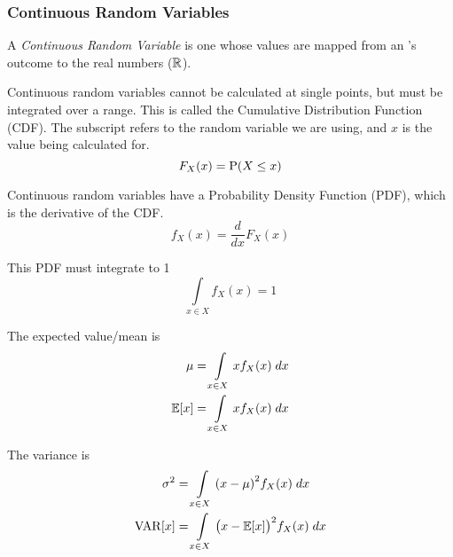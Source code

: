 \subsubsection{Continuous Random Variables}\label{subsubsec:Continuous_Random_Variables}
\begin{definition}\label{def:Continuous_Random_Variable}
  A \emph{Continuous Random Variable} is one whose values are mapped from an 's outcome to the real numbers ($\operatorname{\mathbb{R}}$).

  Continuous random variables cannot be calculated at single points, but must be integrated over a range.
  This is called the Cumulative Distribution Function (CDF).
  The subscript refers to the random variable we are using, and $x$ is the value being calculated for.
  \begin{equation}\label{eq:Continuous_Random_Variable-CDF}
    F_{X}(x) = \operatorname{\operatorname{P}}(X \leq x)
  \end{equation}

  Continuous random variables have a Probability Density Function (PDF), which is the derivative of the CDF.\
  \begin{equation}\label{eq:Continuous_Random_Variable-PDF}
    f_{X}(x) = \frac{d}{dx} F_{X}(x)
  \end{equation}

  This PDF must integrate to 1
  \begin{equation}\label{eq:Continuous_Random_Variable-Integrate_to_One}
    \int\limits_{x \in X} f_{X}(x) = 1
  \end{equation}

  The expected value/mean is
  \begin{equation}\label{eq:Continuous_Random_Variable-Expected_Value}
    \begin{aligned}
      \mu &= \int\limits_{x \in X} x f_{X}(x) \; dx \\
      \operatorname{\operatorname{\mathbb{E}}}[x] &= \int\limits_{x \in X} x f_{X}(x) \; dx \\
    \end{aligned}
  \end{equation}

  The variance is
  \begin{equation}\label{eq:Continuous_Random_Variable-Variance}
    \begin{aligned}
      \sigma^{2} &= \int\limits_{x \in X} {(x - \mu)}^{2} f_{X}(x) \; dx \\
      \operatorname{\operatorname{VAR}}[x] &= \int\limits_{x \in X} {\bigl( x - \operatorname{\operatorname{\mathbb{E}}}[x] \bigr)}^{2} f_{X}(x) \; dx
    \end{aligned}
  \end{equation}
\end{definition}


